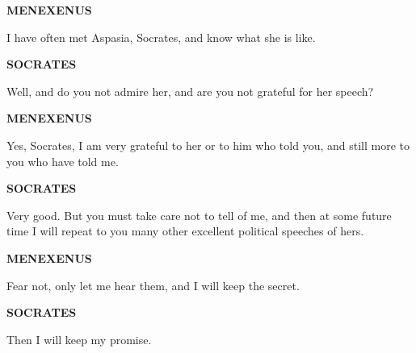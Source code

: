 \documentclass[11pt,letter]{article}
\begin{document}
\par \textbf{MENEXENUS}
\par   I have often met Aspasia, Socrates, and know what she is like.

\par \textbf{SOCRATES}
\par   Well, and do you not admire her, and are you not grateful for her speech?

\par \textbf{MENEXENUS}
\par   Yes, Socrates, I am very grateful to her or to him who told you, and still more to you who have told me.

\par \textbf{SOCRATES}
\par   Very good. But you must take care not to tell of me, and then at some future time I will repeat to you many other excellent political speeches of hers.

\par \textbf{MENEXENUS}
\par   Fear not, only let me hear them, and I will keep the secret.

\par \textbf{SOCRATES}
\par   Then I will keep my promise.

\par 
 
\end{document}
